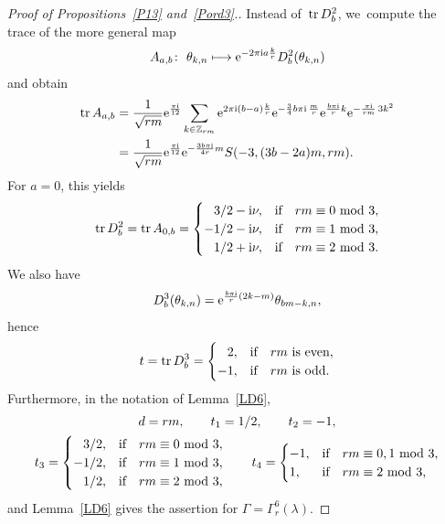 \documentclass[10pt,a4paper]{amsart}
\newcommand\Z{{\mathbb Z}}
\newcommand{\tr}{\mathop{{\rm tr}}}
\numberwithin{equation}{section}
\begin{document}
\begin{proof}[Proof of Propositions~\ref{P13} and~\ref{Pord3}.]
Instead of~$\tr D_b^2$, we~compute the trace of the more general map
\begin{gather*}
A_{a,b}\colon\ \theta_{k,n}\longmapsto {\rm e}^{-2\pi {\rm i} a\frac kr} D_b^2(\theta_{k,n})
\end{gather*}
and obtain
\begin{align}
\tr A_{a,b}&=\frac1{\sqrt{rm}} {\rm e}^{\frac {\pi {\rm i}}{12}}\sum_{k\in\Z_{rm}} {\rm e}^{2\pi {\rm i}(b-a)\frac{k}r} {\rm e}^{-\frac {3}4b\pi {\rm i}\,\frac mr} {\rm e}^{\frac{b\pi {\rm i}}rk} {\rm e}^{-\frac{\pi {\rm i}}{rm}\, 3k^2}\nonumber
\\
&=\frac1{\sqrt{rm}} {\rm e}^{\frac {\pi {\rm i}}{12}} {\rm e}^{-\frac{3b\pi {\rm i}}{4r}m}S(-3,(3b-2a)m,rm).
\label{trA}
\end{align}
For $a=0$, this yields
\begin{gather*}
\tr D_b^2 =\tr A_{0,b}=
\begin{cases}
$\phantom{$-$}$3/2-{\rm i}\nu, &\mbox{if}\quad rm\equiv 0\ {\rm mod}\ 3,
\\
-1/2-{\rm i}\nu, &\mbox{if}\quad rm\equiv 1\ {\rm mod}\ 3,
\\
$\phantom{$-$}$1/2+{\rm i}\nu, &\mbox{if}\quad rm\equiv 2\ {\rm mod}\ 3.
\end{cases}
\end{gather*}
We also have
\begin{gather*}
D_b^3(\theta_{k,n})={\rm e}^{\frac{b\pi {\rm i}}r(2k-m)} \theta_{bm-k,n},
\end{gather*}
hence
\begin{gather*}
t=\tr D_b^3=\begin{cases}
$\phantom{$-$}2$, &\text{if\quad $rm$ is even},
\\
-1,&\text{if\quad $rm$ is odd}.
\end{cases}
\end{gather*}
Furthermore, in the notation of Lemma~\ref{LD6},
\begin{gather*}
d=rm,\qquad t_1=1/2,\qquad t_2=-1,
\\
t_3= \begin{cases}
$\phantom{$-$}$3/2, &\mbox{if}\quad rm\equiv 0\ {\rm mod}\ 3,
\\
-1/2, &\mbox{if}\quad rm\equiv 1\ {\rm mod}\ 3,
\\
$\phantom{$-$}$1/2, &\mbox{if}\quad rm\equiv 2\ {\rm mod}\ 3,
\end{cases}\qquad
t_4=\begin{cases}
-1, &\mbox{if}\quad rm\equiv 0,1\ {\rm mod}\ 3,
\\
1, &\mbox{if}\quad rm\equiv 2\ {\rm mod}\ 3,
\end{cases}
\end{gather*}
and Lemma~\ref{LD6} gives the assertion for $\Gamma=\Gamma^6_r(\lambda)$.


\end{proof}
\end{document}
